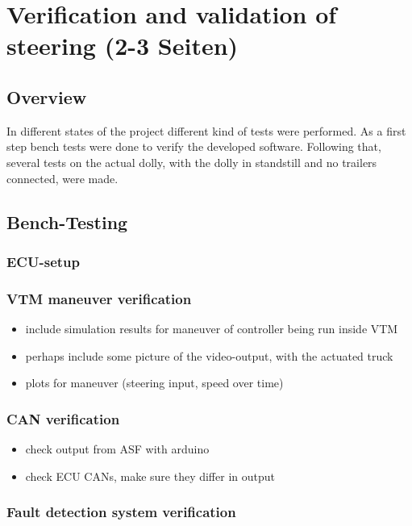 \documentclass[ExampleMasters.tex]{subfiles}
\begin{document}
\clearpage
\chapter{Verification and validation of steering  (2-3 Seiten)}
\label{chap:testing}

\section{Overview}
In different states of the project different kind of tests were performed. As a first step bench tests were done to verify the developed software. Following that, several tests on the actual dolly, with the dolly in standstill and no trailers connected, were made.

\section{Bench-Testing}
\label{sec:bench-testing}
\subsection{ECU-setup}
\subsection{VTM maneuver verification}
\begin{itemize}
	\item include simulation results for maneuver of controller being run inside VTM
	\item perhaps include some picture of the video-output, with the actuated truck
	\item plots for maneuver (steering input, speed over time)
	
\end{itemize}
\subsection{CAN verification}
\begin{itemize}
	\item check output from ASF with arduino
	\item check ECU CANs, make sure they differ in output
	
\end{itemize}

\subsection{Fault detection system verification}
\label{sec:fault_detect_test}
\end{document}

